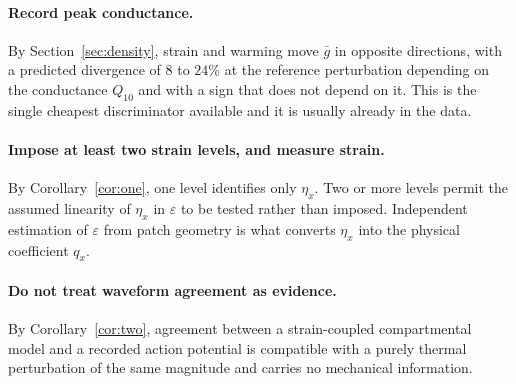 \paragraph{Record peak conductance.}
By Section~\ref{sec:density}, strain and warming move $\bar g$ in opposite
directions, with a predicted divergence of $8$ to $24\%$ at the reference
perturbation depending on the conductance $Q_{10}$ and with a sign that does not
depend on it. This is the single cheapest discriminator available and it is
usually already in the data.

\paragraph{Impose at least two strain levels, and measure strain.}
By Corollary~\ref{cor:one}, one level identifies only $\eta_x$. Two or more
levels permit the assumed linearity of $\eta_x$ in $\varepsilon$ to be tested
rather than imposed. Independent estimation of $\varepsilon$ from patch geometry
is what converts $\eta_x$ into the physical coefficient $q_x$.

\paragraph{Do not treat waveform agreement as evidence.}
By Corollary~\ref{cor:two}, agreement between a strain-coupled compartmental
model and a recorded action potential is compatible with a purely thermal
perturbation of the same magnitude and carries no mechanical information.

